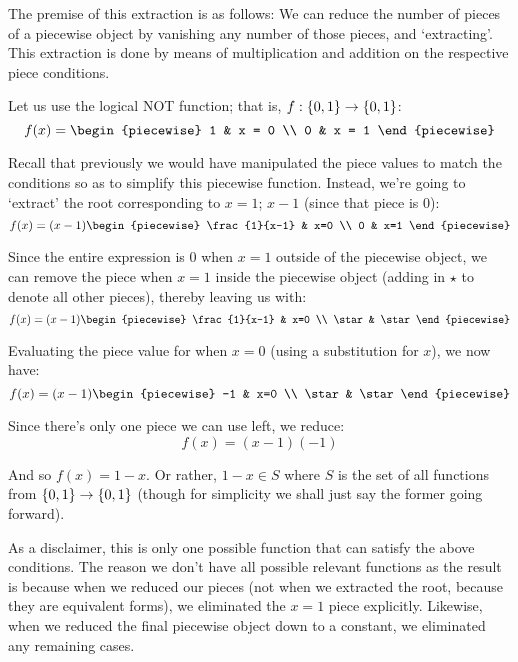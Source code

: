 The premise of this extraction is as follows: We can reduce the number of pieces of a piecewise object by vanishing any number of those pieces, and `extracting'. This extraction is done by means of multiplication and addition on the respective piece conditions.
\begin{example}
    Let us use the logical NOT function; that is, $f:\{0,1\}\to\{0,1\}$:
    $$
        f(x) = \begin{piecewise}
            1 & x = 0 \\
            0 & x = 1
        \end{piecewise}
    $$

    Recall that previously we would have manipulated the piece values to match the conditions so as to simplify this piecewise function. Instead, we're going to `extract' the root corresponding to $x=1$; $x-1$ (since that piece is $0$):
    $$
        f(x) = (x-1)\begin{piecewise}
            \frac{1}{x-1} & x=0 \\
            0 & x=1
        \end{piecewise}
    $$

    Since the entire expression is $0$ when $x=1$ outside of the piecewise object, we can remove the piece when $x=1$ inside the piecewise object (adding in $\star$ to denote all other pieces), thereby leaving us with:
    $$
        f(x) = (x-1)\begin{piecewise}
            \frac{1}{x-1} & x=0 \\
            \star & \star
        \end{piecewise}
    $$

    Evaluating the piece value for when $x=0$ (using a substitution for $x$), we now have:
    $$
        f(x) = (x-1)\begin{piecewise}
            -1 & x=0 \\
            \star & \star
        \end{piecewise}
    $$

    Since there's only one piece we can use left, we reduce:
    $$
        f(x) = (x-1)(-1)
    $$

    And so $f(x)=1-x$. Or rather, $1-x\in S$ where $S$ is the set of all functions from $\{0,1\}\to\{0,1\}$ (though for simplicity we shall just say the former going forward).

    As a disclaimer, this is only one possible function that can satisfy the above conditions. The reason we don't have all possible relevant functions as the result is because when we reduced our pieces (not when we extracted the root, because they are equivalent forms), we eliminated the $x=1$ piece explicitly. Likewise, when we reduced the final piecewise object down to a constant, we eliminated any remaining cases.
\end{example}

